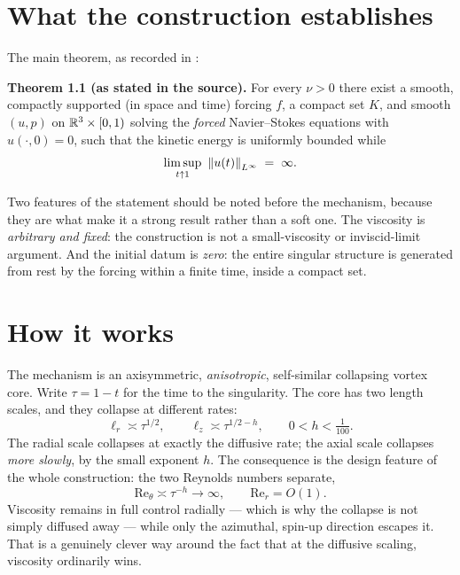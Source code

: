 \section{What the construction establishes}
\label{sec:their-theorem}

The main theorem, as recorded in :

\begin{record}
\textbf{Theorem 1.1 (as stated in the source).} For every \(\nu>0\) there
exist a smooth, compactly supported (in space and time) forcing \(f\), a
compact set \(K\), and smooth \((u,p)\) on \(\mathbb{R}^3\times[0,1)\) solving the
\emph{forced} Navier--Stokes equations with \(u(\cdot,0)=0\), such that the
kinetic energy is uniformly bounded while
\[
  \limsup_{t\uparrow1}\ \left\|u(t)\right\|_{L^\infty} \;=\; \infty .
\]
\end{record}

Two features of the statement should be noted before the mechanism, because
they are what make it a strong result rather than a soft one. The viscosity is
\emph{arbitrary and fixed}: the construction is not a small-viscosity or
inviscid-limit argument. And the initial datum is \emph{zero}: the entire
singular structure is generated from rest by the forcing within a finite time,
inside a compact set.

\section{How it works}
\label{sec:their-mechanism}

The mechanism is an axisymmetric, \emph{anisotropic}, self-similar collapsing
vortex core. Write \(\tau=1-t\) for the time to the singularity. The core has
two length scales, and they collapse at different rates:
\[
  \ell_r \asymp \tau^{1/2},
  \qquad
  \ell_z \asymp \tau^{1/2-h},
  \qquad 0<h<\tfrac1{100}.
\]
The radial scale collapses at exactly the diffusive rate; the axial scale
collapses \emph{more slowly}, by the small exponent \(h\). The consequence is
the design feature of the whole construction: the two Reynolds numbers
separate,
\[
  \mathrm{Re}_\theta \asymp \tau^{-h}\to\infty,
  \qquad
  \mathrm{Re}_r = O(1).
\]
Viscosity remains in full control radially --- which is why the collapse is not
simply diffused away --- while only the azimuthal, spin-up direction escapes
it. That is a genuinely clever way around the fact that at the diffusive
scaling, viscosity ordinarily wins.

